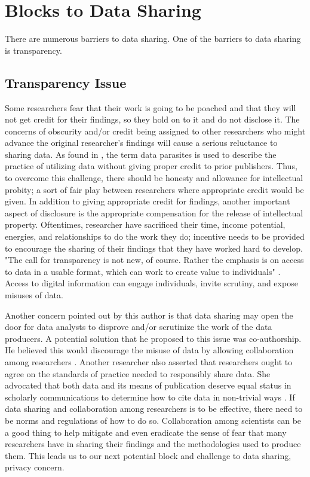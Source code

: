 \documentclass[sigconf]{acmart}
\begin{document}
\section{Blocks to Data Sharing}

There are numerous barriers to data sharing. One of the barriers to data sharing is transparency. 


\subsection{Transparency Issue}

Some researchers fear that their work is going to be poached and that they will not get credit for their findings, so they hold on to it and do not disclose it. The concerns of obscurity and/or credit being assigned to other researchers who might advance the original researcher's findings will cause a serious reluctance to sharing data. As found in \cite{leetaru2016}, the term data parasites is used to describe the practice of utilizing data without giving proper credit to prior publishers. Thus, to overcome this challenge, there should be honesty and allowance for intellectual probity; a sort of fair play between researchers where appropriate credit would be given. In addition to giving appropriate credit for findings, another important aspect of disclosure is the appropriate compensation for the release of intellectual property. Oftentimes, researcher have sacrificed their time, income potential, energies, and relationships to do the work they do; incentive needs to be provided to encourage the sharing of their findings that they have worked hard to develop. "The call for transparency is not new, of course. Rather the emphasis is on access to data in a usable format, which can work to create value to individuals" \cite{tene2012big}. Access to digital information can engage individuals, invite scrutiny, and expose misuses of data. 

Another concern pointed out by this author is that data sharing may open the door for data analysts to disprove and/or scrutinize the work of the data producers. A potential solution that he proposed to this issue was co-authorship. He believed this would discourage the misuse of data by allowing collaboration among researchers \cite{leetaru2016}. Another researcher also asserted that researchers ought to agree on the standards of practice needed to responsibly share data. She advocated that both data and its means of publication deserve equal status in scholarly communications to determine how to cite data in non-trivial ways \cite{borgman2015if}. If data sharing and collaboration among researchers is to be effective, there need to be norms and regulations of how to do so. Collaboration among scientists can be a good thing to help mitigate and even eradicate the sense of fear that many researchers have in sharing their findings and the methodologies used to produce them. This leads us to our next potential block and challenge to data sharing, privacy concern. 
\end{document}
